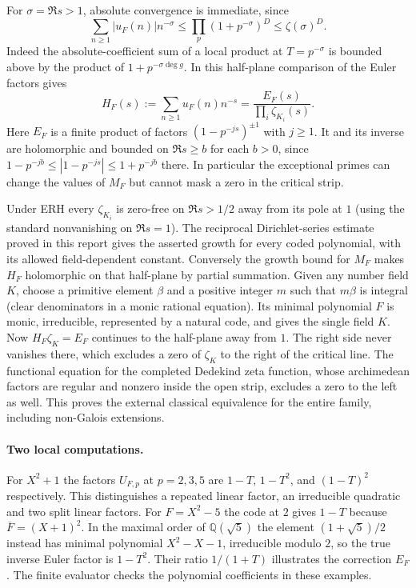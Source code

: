 For $\sigma=\Re s>1$, absolute convergence is immediate, since
\[
 \sum_{n\ge1}|u_F(n)|n^{-\sigma}
  \le \prod_p (1+p^{-\sigma})^D \le \zeta(\sigma)^D.
\]
Indeed the absolute-coefficient sum of a local product at
$T=p^{-\sigma}$ is bounded above by the product of $1+p^{-\sigma\deg g}$.
In this half-plane comparison of the Euler factors gives
\[
 H_F(s):=\sum_{n\ge1}u_F(n)n^{-s}
     =\frac{E_F(s)}{\prod_i\zeta_{K_i}(s)}.
\]
Here $E_F$ is a finite product of factors $(1-p^{-js})^{\pm1}$
with $j\ge1$. It and its inverse are holomorphic and bounded on
$\Re s\ge b$ for each $b>0$, since
$1-p^{-jb}\le|1-p^{-js}|\le1+p^{-jb}$ there. In particular the
exceptional primes can change the values of $M_F$ but cannot mask a
zero in the critical strip.

Under ERH every $\zeta_{K_i}$ is zero-free on $\Re s>1/2$ away from
its pole at $1$ (using the standard nonvanishing on $\Re s=1$).
The reciprocal Dirichlet-series estimate proved in this report gives the
asserted growth for every coded polynomial, with its allowed
field-dependent constant. Conversely the growth bound for $M_F$ makes
$H_F$ holomorphic on that half-plane by partial summation. Given any
number field $K$, choose a primitive element $\beta$ and a positive
integer $m$ such that $m\beta$ is integral (clear denominators in a
monic rational equation). Its minimal polynomial $F$ is monic,
irreducible, represented by a natural code, and gives the single field
$K$. Now $H_F\zeta_K=E_F$ continues to the half-plane away from $1$.
The right side never vanishes there, which excludes a zero of
$\zeta_K$ to the right of the critical line. The functional equation
for the completed Dedekind zeta function, whose archimedean factors
are regular and nonzero inside the open strip, excludes a zero to the
left as well. This proves the external classical equivalence for the
entire family, including non-Galois extensions.

\paragraph{Two local computations.}
For $X^2+1$ the factors $U_{F,p}$ at $p=2,3,5$ are $1-T$, $1-T^2$,
and $(1-T)^2$ respectively. This distinguishes a repeated linear
factor, an irreducible quadratic and two split linear factors.
For $F=X^2-5$ the code at $2$ gives $1-T$ because
$\overline F=(X+1)^2$. In the maximal order of
$\mathbb Q(\sqrt5)$ the element $(1+\sqrt5)/2$ instead has minimal
polynomial $X^2-X-1$, irreducible modulo $2$, so the true inverse
Euler factor is $1-T^2$. Their ratio $1/(1+T)$ illustrates the
correction $E_F$. The finite evaluator checks the polynomial
coefficients in these examples.
